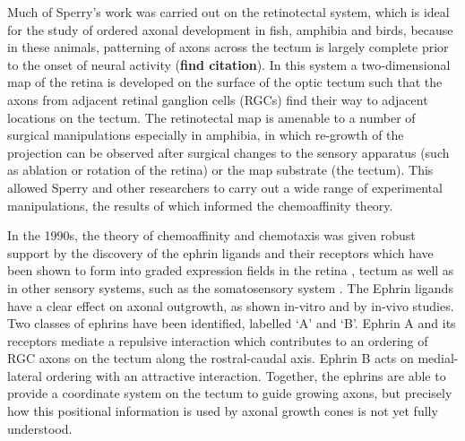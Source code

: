 \documentclass[11pt, a4paper]{article}
\begin{document}
Much of Sperry's work was carried out on the retinotectal system, which is ideal for the study of ordered axonal development in fish, amphibia and birds, because in these animals, patterning of axons across the tectum is largely complete prior to the onset of neural activity (\textbf{find citation}).
In this system a two-dimensional map of the retina is developed on the surface of the optic tectum such that the axons from adjacent retinal ganglion cells (RGCs) find their way to adjacent locations on the tectum.
The retinotectal map is amenable to a number of surgical manipulations especially in amphibia, in which re-growth of the projection can be observed after surgical changes to the sensory apparatus (such as ablation or rotation of the retina) or the map substrate (the tectum).
This allowed Sperry and other researchers to carry out a wide range of experimental manipulations, the results of which informed the chemoaffinity theory.

In the 1990s, the theory of chemoaffinity and chemotaxis was given robust support by the discovery of the ephrin ligands and their receptors \citep{cheng_complementary_1995,drescher_vitro_1995} which have been shown to form into graded expression fields in the retina \citep{braisted_graded_1997}, tectum \citep{braisted_graded_1997,feldheim_genetic_2000} as well as in other sensory systems, such as the somatosensory system \citep{vanderhaeghen_mapping_2000}. %
%
The Ephrin ligands have a clear effect on axonal outgrowth, as shown in-vitro \citep{cheng_complementary_1995,drescher_vitro_1995,hansen_retinal_2004} and by in-vivo \citep{frisen_ephrin-a5_1998,rodger_transient_2000,mann_topographic_2002,hindges_ephb_2002} studies.
Two classes of ephrins have been identified, labelled `A' and `B'.
Ephrin A and its receptors mediate a repulsive interaction which contributes to an ordering of RGC axons on the tectum along the rostral-caudal axis. Ephrin B acts on medial-lateral ordering with an attractive interaction.
Together, the ephrins are able to provide a coordinate system on the tectum to guide growing axons, but precisely how this positional information is used by axonal growth cones is not yet fully understood.
\end{document}
